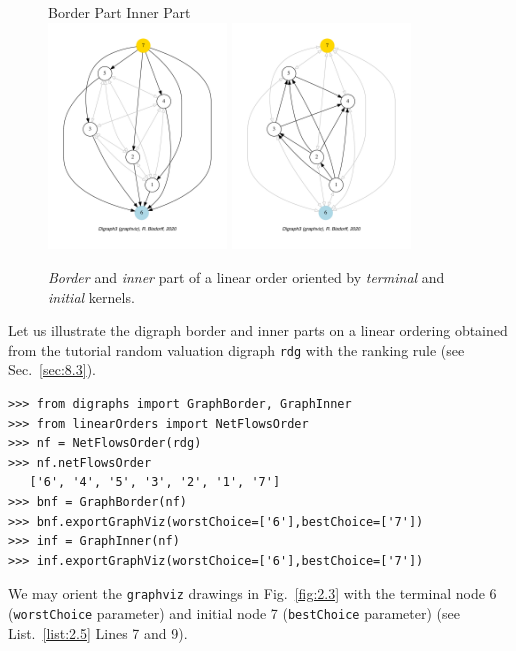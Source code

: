 \begin{figure}[ht]
  Border Part \hfill Inner Part \\
  \includegraphics[height=6cm]{Figures/2-3-linearOrderBorder.pdf}\hfill
  \includegraphics[height=6cm]{Figures/2-3-linearOrderInner.pdf}\hfill
\caption{\emph{Border} and \emph{inner} part of a linear order oriented by \emph{terminal} and \emph{initial} kernels.}
\label{fig:2.3}       %
\end{figure}
Let us illustrate the digraph border and inner parts on a linear ordering obtained from the tutorial random valuation digraph \texttt{rdg}  with the \NetFlows ranking rule  (see Sec.~\ref{sec:8.3}).  
\begin{lstlisting}[caption={Border and inner part of a linear order},label=list:2.5]
>>> from digraphs import GraphBorder, GraphInner
>>> from linearOrders import NetFlowsOrder
>>> nf = NetFlowsOrder(rdg)
>>> nf.netFlowsOrder
   ['6', '4', '5', '3', '2', '1', '7']
>>> bnf = GraphBorder(nf)
>>> bnf.exportGraphViz(worstChoice=['6'],bestChoice=['7'])
>>> inf = GraphInner(nf)
>>> inf.exportGraphViz(worstChoice=['6'],bestChoice=['7'])
\end{lstlisting}
We may orient the \texttt{graphviz} drawings in Fig.~\vref{fig:2.3}  with the terminal node 6 (\texttt{worstChoice} parameter) and initial node 7 (\texttt{bestChoice} parameter) (see List.~\vref{list:2.5} Lines 7 and 9).

